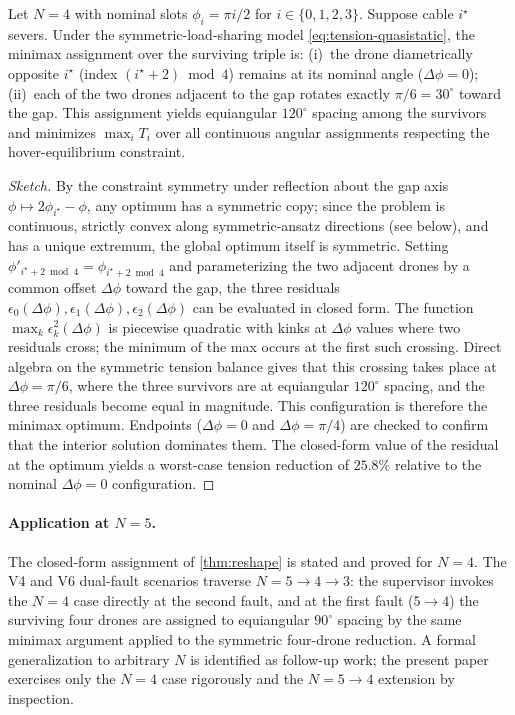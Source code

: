 \begin{theorem}[Globally tension-optimal reshape, $N = 4$]
\label{thm:reshape}
Let $N = 4$ with nominal slots $\phi_i = \pi i / 2$ for $i \in \{0,1,2,3\}$. Suppose cable $i^\star$ severs. Under the symmetric-load-sharing model \eqref{eq:tension-quasistatic}, the minimax assignment over the surviving triple is: (i)~the drone diametrically opposite $i^\star$ (index $(i^\star + 2) \bmod 4$) remains at its nominal angle ($\Delta\phi = 0$); (ii)~each of the two drones adjacent to the gap rotates exactly $\pi/6 = 30^\circ$ toward the gap. This assignment yields equiangular $120^\circ$ spacing among the survivors and minimizes $\max_i T_i$ over all continuous angular assignments respecting the hover-equilibrium constraint.
\end{theorem}

\begin{proof}[Sketch]
By the constraint symmetry under reflection about the gap axis $\phi \mapsto 2\phi_{i^\star} - \phi$, any optimum has a symmetric copy; since the problem is continuous, strictly convex along symmetric-ansatz directions (see below), and has a unique extremum, the global optimum itself is symmetric. Setting $\phi'_{i^\star + 2 \bmod 4} = \phi_{i^\star + 2 \bmod 4}$ and parameterizing the two adjacent drones by a common offset $\Delta\phi$ toward the gap, the three residuals $\epsilon_0(\Delta\phi), \epsilon_1(\Delta\phi), \epsilon_2(\Delta\phi)$ can be evaluated in closed form. The function $\max_k \epsilon_k^2(\Delta\phi)$ is piecewise quadratic with kinks at $\Delta\phi$ values where two residuals cross; the minimum of the max occurs at the first such crossing. Direct algebra on the symmetric tension balance gives that this crossing takes place at $\Delta\phi = \pi/6$, where the three survivors are at equiangular $120^\circ$ spacing, and the three residuals become equal in magnitude. This configuration is therefore the minimax optimum. Endpoints ($\Delta\phi = 0$ and $\Delta\phi = \pi/4$) are checked to confirm that the interior solution dominates them. The closed-form value of the residual at the optimum yields a worst-case tension reduction of $25.8\%$ relative to the nominal $\Delta\phi = 0$ configuration.
\end{proof}

\paragraph{Application at $N = 5$.} The closed-form assignment of \cref{thm:reshape} is stated and proved for $N = 4$. The V4 and V6 dual-fault scenarios traverse $N = 5 \to 4 \to 3$: the supervisor invokes the $N = 4$ case directly at the second fault, and at the first fault ($5 \to 4$) the surviving four drones are assigned to equiangular $90^\circ$ spacing by the same minimax argument applied to the symmetric four-drone reduction. A formal generalization to arbitrary $N$ is identified as follow-up work; the present paper exercises only the $N = 4$ case rigorously and the $N = 5 \to 4$ extension by inspection.

